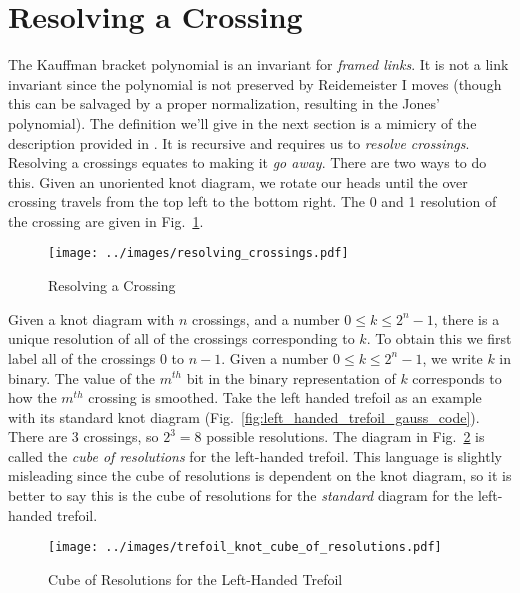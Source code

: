 \documentclass{article}
\theoremstyle{plain}
\begin{document}
    \section{Resolving a Crossing}
        The Kauffman bracket polynomial is an invariant for
        \textit{framed links}. It is not a link invariant since the polynomial
        is not preserved by Reidemeister I moves (though this can be salvaged
        by a proper normalization, resulting in the Jones' polynomial). The
        definition we'll give in the next section is a mimicry of the
        description provided in \cite{barnatan2002khovanov}. It is recursive
        and requires us to \textit{resolve crossings}. Resolving a crossings
        equates to making it \textit{go away}. There are two ways to do this.
        Given an unoriented knot diagram, we rotate our heads until
        the over crossing travels from the top left to the bottom right. The
        0 and 1 resolution of the crossing are given in
        Fig.~\ref{fig:resolving_crossing}.
        \begin{figure}
            \centering
            \texttt{[image: ../images/resolving\_crossings.pdf]}
            \caption{Resolving a Crossing}
            \label{fig:resolving_crossing}
        \end{figure}
        Given a knot diagram with $n$ crossings, and a number
        $0\leq{k}\leq{2}^{n}-1$, there is a unique resolution of all of the
        crossings corresponding to $k$. To obtain this we first label all of
        the crossings $0$ to $n-1$. Given a number $0\leq{k}\leq{2}^{n}-1$,
        we write $k$ in binary. The value of the $m^{th}$ bit in the
        binary representation of $k$ corresponds to how the $m^{th}$ crossing
        is smoothed. Take the left handed trefoil as an example with its
        standard knot diagram (Fig.~\ref{fig:left_handed_trefoil_gauss_code}).
        There are 3 crossings, so $2^{3}=8$ possible resolutions. The diagram
        in Fig.~\ref{fig:trefoil_knot_cube_of_resolutions} is called the
        \textit{cube of resolutions} for the left-handed
        trefoil. This language is slightly misleading since the cube of
        resolutions is dependent on the knot diagram, so it is better to say
        this is the cube of resolutions for the \textit{standard} diagram for
        the left-handed trefoil.
        \begin{figure}
            \centering
            \texttt{[image: ../images/trefoil\_knot\_cube\_of\_resolutions.pdf]}
            \caption{Cube of Resolutions for the Left-Handed Trefoil}
            \label{fig:trefoil_knot_cube_of_resolutions}
        \end{figure}
\end{document}
